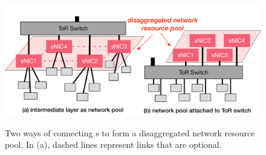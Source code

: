 {
\begin{figure}
\begin{center}
\centerline{\includegraphics[width=\columnwidth]{Figures/fig-topology.pdf}}
\vspace{-0.1in}
{
Two ways of connecting \snic{}s to form a disaggregated network resource pool. In (a), dashed lines represent links that are optional.
}
\end{center}
\vspace{-0.2in}
\end{figure}
}
